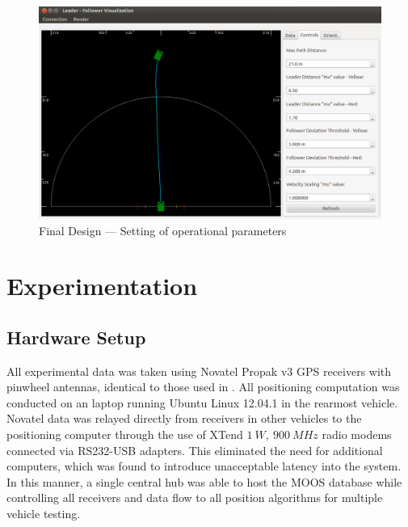 \documentclass[12pt]{report}
\begin{document}
\begin{figure}[ht] \centering
    \includegraphics[width=6.5in]{./figs/final_design_opts.png}
    \caption{Final Design --- Setting of operational parameters }
    \label{fig:finaldesopts}
\end{figure}


\chapter{Experimentation}
\label{chap:exper}

\section{Hardware Setup}
\label{sec:hardware}

All experimental data was taken using Novatel Propak v3 GPS receivers with pinwheel antennas, identical to those used in \cite{scottthesis}. All positioning computation was conducted on an laptop running Ubuntu Linux 12.04.1 in the rearmost vehicle. Novatel data was relayed directly from receivers in other vehicles to the positioning computer through the use of XTend $1~W,~900~MHz$ radio modems connected via RS232-USB adapters. This eliminated the need for additional computers, which was found to introduce unacceptable latency into the system. In this manner, a single central hub was able to host the MOOS database while controlling all receivers and data flow to all position algorithms for multiple vehicle testing.
\end{document}

